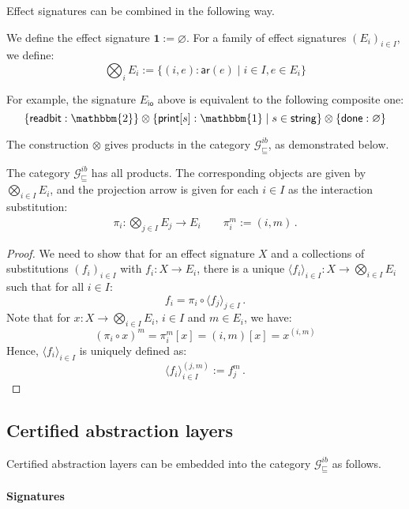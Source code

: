 \documentclass[sigplan,screen]{acmart}
\newcommand{\gcat}{\mathcal{G}_{\sqsubseteq}}
\newcommand{\kw}[1]{\ensuremath{ \mathsf{#1} }}
\begin{document}
Effect signatures can be combined in the following way.

\begin{definition}
We define the effect signature
$\mathbf{1} := \varnothing$.
For a family of effect signatures $(E_i)_{i \in I}$,
we define:
\[
  \bigotimes_i E_i := \{ (i, e) : \kw{ar}(e) \mid i \in I, e \in E_i \}
\]
\end{definition}

For example,
the signature $E_\kw{io}$ above is equivalent
to the following composite one:
\[
    \{ \kw{readbit} : \mathbbm{2} \} \otimes
    \{ \kw{print}[s] : \mathbbm{1} \mid s \in \kw{string} \} \otimes
    \{ \kw{done} : \varnothing \}
\]

The construction $\otimes$ gives products in the category $\gcat^{ib}$,
as demonstrated below.

\begin{lemma}
The category $\gcat^{ib}$ has all products.
The corresponding objects are given by $\bigotimes_{i \in I} E_i$,
and the projection arrow
is given for each $i \in I$ as
the interaction substitution:
\begin{gather*}
    \pi_i : \bigotimes_{j \in I} E_j \rightarrow E_i \qquad
    \pi_i^m := (i, m) \,.
\end{gather*}
\begin{proof}
We need to show that for an effect signature $X$
and a collections of substitutions $(f_i)_{i \in I}$ with
$f_i : X \rightarrow E_i$,
there is a unique
$\langle f_i \rangle_{i \in I} : X \rightarrow \bigotimes_{i \in I} E_i$
such that for all $i \in I$:
\[
    f_i = \pi_i \circ \langle f_j \rangle_{j \in I} \,.
\]
Note that for $x : X \rightarrow \bigotimes_{i \in I} E_i$,
$i \in I$ and $m \in E_i$, we have:
\[
    (\pi_i \circ x)^m = \pi_i^m[x] = (i, m) [x] = x^{(i, m)}
\]
Hence, $\langle f_i \rangle_{i \in I}$ is uniquely defined as:
\[
    \langle f_i \rangle_{i \in I}^{(j, m)} := f_j^m \,.
\]
\end{proof}
\end{lemma}


\subsection{Certified abstraction layers} \label{sec:intspec:cal} %

Certified abstraction layers can be embedded into
the category $\gcat^{ib}$ as follows.

\paragraph{Signatures}
\end{document}
